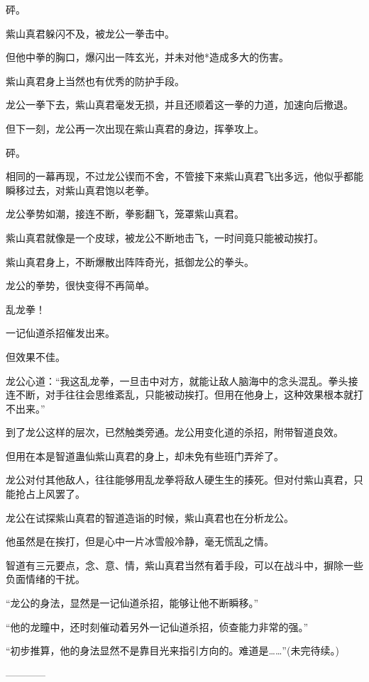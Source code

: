 \begin{this_body}
砰。

紫山真君躲闪不及，被龙公一拳击中。

但他中拳的胸口，爆闪出一阵玄光，并未对他*造成多大的伤害。

紫山真君身上当然也有优秀的防护手段。

龙公一拳下去，紫山真君毫发无损，并且还顺着这一拳的力道，加速向后撤退。

但下一刻，龙公再一次出现在紫山真君的身边，挥拳攻上。

砰。

相同的一幕再现，不过龙公锲而不舍，不管接下来紫山真君飞出多远，他似乎都能瞬移过去，对紫山真君饱以老拳。

龙公拳势如潮，接连不断，拳影翻飞，笼罩紫山真君。

紫山真君就像是一个皮球，被龙公不断地击飞，一时间竟只能被动挨打。

紫山真君身上，不断爆散出阵阵奇光，抵御龙公的拳头。

龙公的拳势，很快变得不再简单。

乱龙拳！

一记仙道杀招催发出来。

但效果不佳。

龙公心道：“我这乱龙拳，一旦击中对方，就能让敌人脑海中的念头混乱。拳头接连不断，对手往往会思维紊乱，只能被动挨打。但用在他身上，这种效果根本就打不出来。”

到了龙公这样的层次，已然触类旁通。龙公用变化道的杀招，附带智道良效。

但用在本是智道蛊仙紫山真君的身上，却未免有些班门弄斧了。

龙公对付其他敌人，往往能够用乱龙拳将敌人硬生生的揍死。但对付紫山真君，只能抢占上风罢了。

龙公在试探紫山真君的智道造诣的时候，紫山真君也在分析龙公。

他虽然是在挨打，但是心中一片冰雪般冷静，毫无慌乱之情。

智道有三元要点，念、意、情，紫山真君当然有着手段，可以在战斗中，摒除一些负面情绪的干扰。

“龙公的身法，显然是一记仙道杀招，能够让他不断瞬移。”

“他的龙瞳中，还时刻催动着另外一记仙道杀招，侦查能力非常的强。”

“初步推算，他的身法显然不是靠目光来指引方向的。难道是……”(未完待续。)

------------

\end{this_body}

